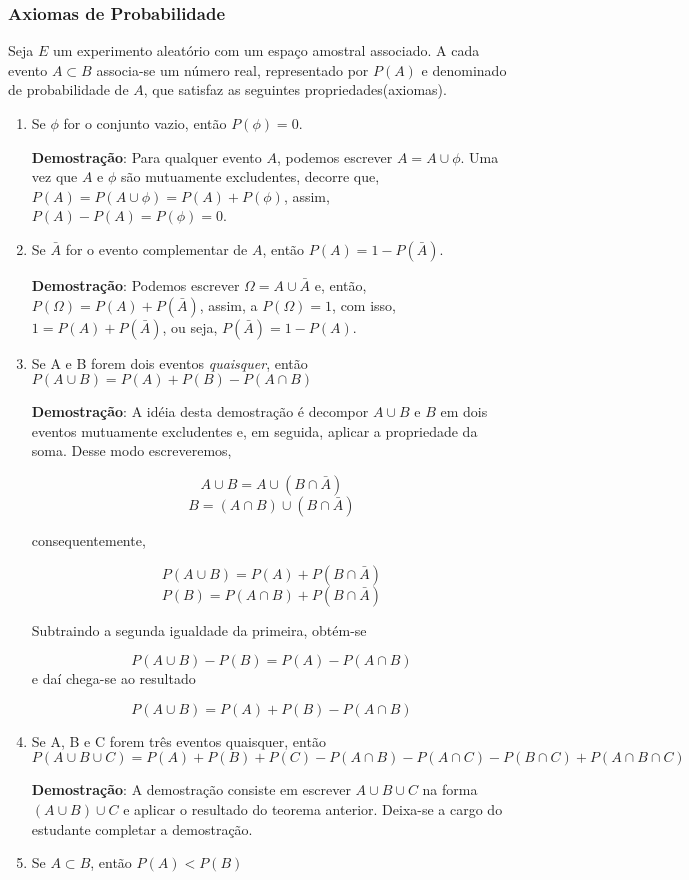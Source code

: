 \subsubsection{Axiomas de Probabilidade}

\inic Seja $E$ um experimento aleatório com um espaço amostral associado. A cada evento $A \subset B$ associa-se um número real, representado por $P(A)$ e denominado de probabilidade de $A$, que satisfaz as seguintes propriedades(axiomas).

\begin{enumerate}
    \item Se $\phi$ for o conjunto vazio, então
    $P(\phi)=0$.

\textbf{Demostração}: Para qualquer evento $A$, podemos escrever
$A=A\cup \phi$. Uma vez que $A$ e $\phi$ são mutuamente
excludentes, decorre que, $P(A)=P(A\cup \phi)= P(A)+P(\phi)$,
assim, $P(A)- P(A)= P(\phi)= 0$.
    \item Se $\bar{A}$ for o evento complementar de $A$, então
    $P(A)=1-P(\bar{A})$.

\textbf{Demostração}: Podemos escrever $\Omega = A \cup \bar{A}$
e, então, $P(\Omega)= P(A)+ P(\bar{A})$, assim, a $P(\Omega)=1$,
com isso, $1= P(A)+P(\bar{A})$, ou seja, $P(\bar{A})= 1- P(A)$.
    \item Se A e B forem dois eventos \emph{quaisquer}, então $P(A\cup B)=P(A)+P(B)-P(A\cap B)$

\textbf{Demostração}: A idéia desta demostração é decompor $A\cup
B$ e $B$ em dois eventos mutuamente excludentes e, em seguida,
aplicar a propriedade da soma. Desse modo escreveremos,

$$A \cup B= A\cup (B\cap \bar{A})$$
$$B= (A \cap B) \cup (B\cap \bar{A})$$

consequentemente,

$$P(A \cup B)= P(A)+P(B \cap \bar{A})$$
$$ P(B) = P(A \cap B) + P(B \cap \bar{A})$$

Subtraindo a segunda igualdade da primeira, obtém-se

$$ P(A \cup B) - P(B) = P(A)- P(A \cap B)$$
 e daí chega-se ao resultado

$$ P(A \cup B) = P(A)+P(B)- P(A \cap B)$$
    \item Se A, B e C forem três eventos quaisquer, então $P(A \cup B \cup C) = P(A)+P(B)+P(C)-P(A\cap B)-P(A\cap C)-P(B\cap C)+P(A\cap B \cap C)$


\textbf{ \maltese Demostração}: A demostração consiste em escrever
$A \cup B \cup C$ na forma $(A \cup B)\cup C$ e aplicar o
resultado do teorema anterior. Deixa-se a cargo do estudante
completar a demostração.

    \item Se $A \subset B$, então $P(A) < P(B)$
\end{enumerate}

